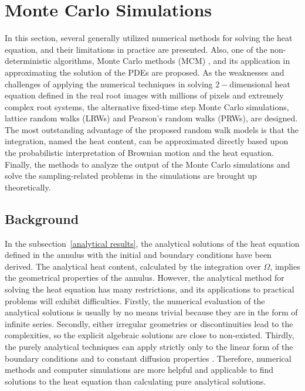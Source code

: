 \section{Monte Carlo Simulations}

In this section, several generally utilized numerical methods
\cite{grossmann2007numerical}\cite{zlamal1968finite}
\cite{eymard2000finite} \cite{attaway1991boundary} for solving the
heat equation, and their limitations in practice are presented. Also,
one of the non-deterministic algorithms, Monte Carlo methods (MCM)
\cite{rubinstein2016simulation} \cite{kroese2014monte}, and its
application in approximating the solution of the PDEs are proposed. As
the weaknesses and challenges of applying the numerical techniques in
solving $2-$dimensional heat equation defined in the real root images
with millions of pixels and extremely complex root systems, the
alternative fixed-time step Monte Carlo simulations, lattice random
walks (LRWs) and Pearson's random walks (PRWs), are designed. The most
outstanding advantage of the proposed random walk models is that the
integration, named the heat content, can be approximated directly
based upon the probabilistic interpretation of Brownian motion and the
heat equation.  Finally, the methods to analyze the output of the
Monte Carlo simulations and solve the sampling-related problems in the
simulations are brought up theoretically.



\subsection{Background}\label{background}

In the subsection~\ref{analytical results}, the analytical solutions
of the heat equation defined in the annulus with the initial and
boundary conditions have been derived. The analytical heat content,
calculated by the integration over $\Omega$, implies the geometrical
properties of the annulus. However, the analytical method for solving
the heat equation has many restrictions, and its applications to
practical problems will exhibit difficulties. Firstly, the numerical
evaluation of the analytical solutions is usually by no means trivial
because they are in the form of infinite series. Secondly, either
irregular geometries or discontinuities lead to the complexities, so
the explicit algebraic solutions are close to non-existed. Thirdly,
the purely analytical techniques can apply strictly only to the linear
form of the boundary conditions and to constant diffusion properties
\cite{crank1979mathematics}. Therefore, numerical methods and computer
simulations are more helpful and applicable to find solutions to the
heat equation than calculating pure analytical solutions.

